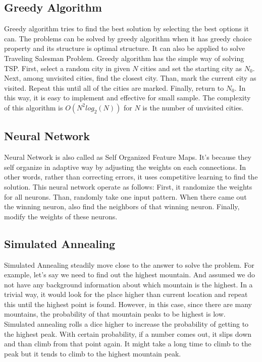 \documentclass[12pt]{article}
\begin{document}
\subsection*{Greedy Algorithm}
Greedy algorithm tries to find the best solution by selecting the best options it can. The problems can be solved by greedy algorithm when it has greedy choice property and its structure is optimal structure.\cite{GreedyProperty} It can also be applied to solve Traveling Salesman Problem. Greedy algorithm has the simple way of solving TSP. First, select a random city in given $N$ cities and set the starting city as $N_0$. Next, among unvisited cities, find the closest city. Than, mark the current city as visited. Repeat this until all of the cities are marked. Finally, return to $N_0$. In this way, it is easy to implement and effective for small sample. The complexity of this algorithm is $O(N^2 log_2(N))$ for $N$ is the number of unvisited cities.
\subsection*{Neural Network}
Neural Network is also called as Self Organized Feature Maps. It's because they self organize in adaptive way by adjusting the weights on each connections.\cite{Neural} In other words, rather than correcting errors, it uses competitive learning to find the solution. This neural network operate as follows: First, it randomize the weights for all neurons. Than, randomly take one input pattern. When there came out the winning neuron, also find the neighbors of that winning neuron. Finally, modify the weights of these neurons.\cite{SOM} %
\subsection*{Simulated Annealing}
Simulated Annealing steadily move close to the answer to solve the problem. For example, let's say we need to find out the highest mountain. And assumed we do not have any background information about which mountain is the highest. In a trivial way, it would look for the place higher than current location and repeat this until the highest point is found. However, in this case, since there are many mountains, the probability of that mountain peaks to be highest is low.\cite{mountain} Simulated annealing rolls a dice higher to increase the probability of getting to the highest peak. With certain probability, if a number comes out, it slips down and than climb from that point again. It might take a long time to climb to the peak but it tends to climb to the highest mountain peak.\cite{Simulated}
\end{document}

